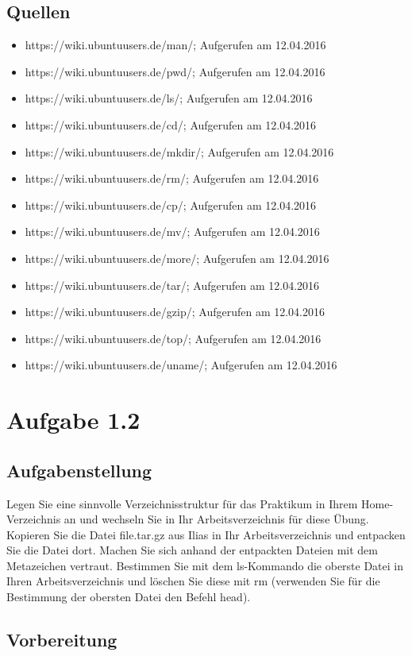 	\subsection{Quellen}
		\begin{itemize}
			\item https://wiki.ubuntuusers.de/man/; Aufgerufen am 12.04.2016
			\item https://wiki.ubuntuusers.de/pwd/; Aufgerufen am 12.04.2016
			\item https://wiki.ubuntuusers.de/ls/; Aufgerufen am 12.04.2016
			\item https://wiki.ubuntuusers.de/cd/; Aufgerufen am 12.04.2016
			\item https://wiki.ubuntuusers.de/mkdir/; Aufgerufen am 12.04.2016
			\item https://wiki.ubuntuusers.de/rm/; Aufgerufen am 12.04.2016
			\item https://wiki.ubuntuusers.de/cp/; Aufgerufen am 12.04.2016
			\item https://wiki.ubuntuusers.de/mv/; Aufgerufen am 12.04.2016
			\item https://wiki.ubuntuusers.de/more/; Aufgerufen am 12.04.2016
			\item https://wiki.ubuntuusers.de/tar/; Aufgerufen am 12.04.2016
			\item https://wiki.ubuntuusers.de/gzip/; Aufgerufen am 12.04.2016
			\item https://wiki.ubuntuusers.de/top/; Aufgerufen am 12.04.2016
			\item https://wiki.ubuntuusers.de/uname/; Aufgerufen am 12.04.2016
		\end{itemize}
\section{Aufgabe 1.2}
	\subsection{Aufgabenstellung}
		Legen Sie eine sinnvolle Verzeichnisstruktur f\"ur das Praktikum in Ihrem Home-Verzeichnis an und wechseln Sie in Ihr Arbeitsverzeichnis f\"ur diese \"Ubung. Kopieren Sie die Datei file.tar.gz aus Ilias in Ihr Arbeitsverzeichnis und entpacken Sie die Datei dort. Machen Sie sich anhand der entpackten Dateien mit dem Metazeichen vertraut. Bestimmen Sie mit dem ls-Kommando die oberste Datei in Ihren Arbeitsverzeichnis und l\"oschen Sie diese mit rm (verwenden Sie f\"ur die Bestimmung der obersten Datei den Befehl head).
	\subsection{Vorbereitung}
